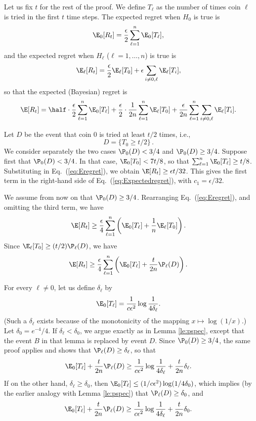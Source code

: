 Let us fix $t$ for the rest of the proof.
We define $T_\ell$ as the number of times coin $\ell$ is tried in the first $t$ time steps.
The expected regret when $H_0$ is true is
$$
\E_0 [R_t] = \frac{\epsilon}{2}\sum_{ \ell=1 }^n  \E_0 [T_\ell],
$$
and the expected regret when $H_\ell$ ($\ell=1,\ldots,n$) is true is
$$
\E_\ell [R_t] = \frac{\epsilon}{2} \E_\ell [T_0] + \epsilon \sum_{ i\neq 0,\ell}  \E_\ell [T_i],
$$
so that the expected (Bayesian) regret is
\begin{equation}
\label{eq:Eregret}
\E [R_t]  =   \half\cdot \frac{\epsilon}{2} \sum_{\ell=1}^n \E_0 [T_\ell] +
\frac{\epsilon}{2}\cdot \frac{1}{2n} \sum_{\ell=1}^n \E_\ell [T_0] +
\frac{\epsilon}{2n} \sum_{\ell=1}^n \sum_{i\neq 0,\ell}  \E_{\ell} [T_i].
\end{equation}

Let $D$ be the event that coin 0 is tried at least $t/2$ times, i.e.,
$$
D = \{ T_0 \ge t/2\}\,.
$$
We consider separately the two cases $\P_0 (D) < 3/4 $ and $\P_0 (D) \geq 3/4 $.
Suppose first that $\P_0 (D) < 3/4 $.
In that case, $\E_0[T_0] < {7}t/{8}$, so that
$\sum_{\ell=1}^n \E_0 [T_\ell] \ge t/8$.
Substituting in Eq.~(\ref{eq:Eregret}), we obtain
$\E[R_t] \geq \epsilon t / 32$. This gives the first term in the right-hand side of
Eq.~(\ref{eq:Expectedregret}), with
$c_1= \epsilon/32$.

We assume from now on that $\P_0 (D) \geq 3/4 $.
Rearranging Eq.~(\ref{eq:Eregret}), and omitting the third term, we have
$$
\E [R_t] \ge \frac{\epsilon}{4} \sum_{\ell=1}^n \left(
\E_0 [T_\ell] + \frac{1}{n}\E_\ell [T_0] \right).
$$
Since $\E_\ell [T_0] \ge (t/2) \P_\ell(D)$, we have
\begin{equation}\label{eq:rr}
\E [R_t] \ge \frac{\epsilon}{4} \sum_{\ell=1}^n \left(
\E_0 [T_\ell] + \frac{t}{2n}\P_\ell(D) \right).
\end{equation}


For every $\ell\neq 0$, let us define $\delta_{\ell}$ by
$$\E_0 [T_\ell] = \frac{1}{c \epsilon ^2} \log\frac{1}{4\delta_\ell}.$$
(Such a $\delta_\ell$ exists because of the monotonicity of the mapping $x\mapsto \log(1/x)$.)
Let $\delta_0=e^{-4}/4$. If $\delta_\ell< \delta_0$, we argue exactly as in Lemma \ref{le:pspec}, except that the event $B$ in that lemma is
replaced by event $D$. Since $\P_0(D)\ge 3/4$, the same proof applies and shows that  $\P_\ell (D) \geq\delta_\ell$, so that
$$\E_0 [T_\ell] + \frac{t}{2n}\P_\ell(D)\geq
\frac{1}{c \epsilon ^2} \log\frac{1}{4 \delta_\ell} + \frac{t}{2n} \delta_{\ell}.$$
If on the other hand, $\delta_{\ell}\geq \delta_0$,
then
$\E_0 [T_\ell] \leq  (1/c \epsilon ^2) \log(1/4\delta_0)$, which implies (by the earlier analogy with Lemma \ref{le:pspec}) that
$\P_\ell(D)\geq \delta_0$, and
$$\E_0 [T_\ell] + \frac{t}{2n}\P_\ell(D)\geq
\frac{1}{c \epsilon ^2} \log\frac{1}{4 \delta_\ell} + \frac{t}{2n} \delta_{0}.$$

